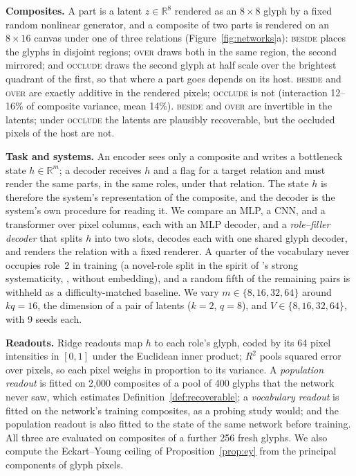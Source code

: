 \documentclass[10pt]{article}
\theoremstyle{plain}
\theoremstyle{remark}
\newcommand{\R}{\mathbb{R}}
\begin{document}
\textbf{Composites.} A part is a latent $z \in \R^{8}$ rendered as an $8 \times 8$ glyph by a fixed random nonlinear generator, and a composite of two parts is rendered on an $8 \times 16$ canvas under one of three relations (Figure~\ref{fig:networks}a): \textsc{beside} places the glyphs in disjoint regions; \textsc{over} draws both in the same region, the second mirrored; and \textsc{occlude} draws the second glyph at half scale over the brightest quadrant of the first, so that where a part goes depends on its host. \textsc{beside} and \textsc{over} are exactly additive in the rendered pixels; \textsc{occlude} is not (interaction 12--16\% of composite variance, mean 14\%). \textsc{beside} and \textsc{over} are invertible in the latents; under \textsc{occlude} the latents are plausibly recoverable, but the occluded pixels of the host are not.

\textbf{Task and systems.} An encoder sees only a composite and writes a bottleneck state $h \in \R^m$; a decoder receives $h$ and a flag for a target relation and must render the same parts, in the same roles, under that relation. The state $h$ is therefore the system's representation of the composite, and the decoder is the system's own procedure for reading it. We compare an MLP, a CNN, and a transformer over pixel columns, each with an MLP decoder, and a \emph{role--filler decoder} that splits $h$ into two slots, decodes each with one shared glyph decoder, and renders the relation with a fixed renderer. A quarter of the vocabulary never occupies role~2 in training (a novel-role split in the spirit of \citeauthor{hadley1994}'s strong systematicity, \citeyear{hadley1994}, without embedding), and a random fifth of the remaining pairs is withheld as a difficulty-matched baseline. We vary $m \in \{8, 16, 32, 64\}$ around $kq = 16$, the dimension of a pair of latents ($k = 2$, $q = 8$), and $V \in \{8, 16, 32, 64\}$, with 9 seeds each.

\textbf{Readouts.} Ridge readouts map $h$ to each role's glyph, coded by its 64 pixel intensities in $[0, 1]$ under the Euclidean inner product; $R^2$ pools squared error over pixels, so each pixel weighs in proportion to its variance. A \emph{population readout} is fitted on 2{,}000 composites of a pool of 400 glyphs that the network never saw, which estimates Definition~\ref{def:recoverable}; a \emph{vocabulary readout} is fitted on the network's training composites, as a probing study would; and the population readout is also fitted to the state of the same network before training. All three are evaluated on composites of a further 256 fresh glyphs. We also compute the Eckart--Young ceiling of Proposition~\ref{prop:ey} from the principal components of glyph pixels.
\end{document}
